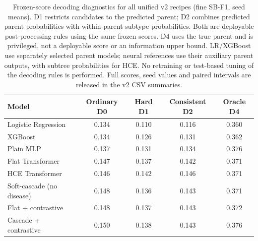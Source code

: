 \begin{table}[H]
\centering\small
\setlength{\tabcolsep}{4pt}
\begin{tabular}{lcccc}
\toprule
Model & Ordinary D0 & Hard D1 & Consistent D2 & Oracle D4 \\
\midrule
Logistic Regression & 0.134 & 0.110 & 0.116 & 0.360 \\
XGBoost & 0.134 & 0.126 & 0.131 & 0.362 \\
Plain MLP & 0.137 & 0.131 & 0.134 & 0.376 \\
Flat Transformer & 0.147 & 0.137 & 0.142 & 0.371 \\
HCE Transformer & 0.146 & 0.142 & 0.146 & 0.371 \\
Soft-cascade (no disease) & 0.148 & 0.136 & 0.143 & 0.371 \\
Flat + contrastive & 0.148 & 0.137 & 0.143 & 0.372 \\
Cascade + contrastive & 0.150 & 0.138 & 0.143 & 0.376 \\
\bottomrule
\end{tabular}
\caption{Frozen-score decoding diagnostics for all unified v2 recipes (fine SB-F1, seed means). D1 restricts candidates to the predicted parent; D2 combines predicted parent probabilities with within-parent subtype probabilities. Both are deployable post-processing rules using the same frozen scores. D4 uses the true parent and is privileged, not a deployable score or an information upper bound. LR/XGBoost use separately selected parent models; neural references use their auxiliary parent outputs, with subtree probabilities for HCE. No retraining or test-based tuning of the decoding rules is performed. Full scores, seed values and paired intervals are released in the v2 CSV summaries.}
\label{tab:unified_decoding}
\end{table}
